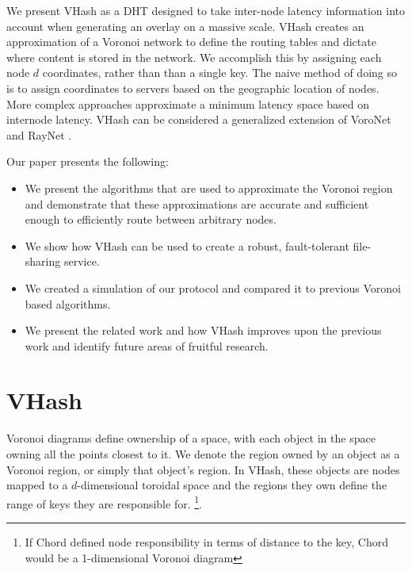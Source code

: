 \documentclass{IEEEtran}
\begin{document}
 

We present VHash as a DHT designed to take inter-node latency information into account when generating an overlay on a massive scale.  VHash creates an approximation of a Voronoi network to define the routing tables and dictate where content is stored in the network.  We accomplish this by assigning each node $d$ coordinates, rather than than a single key.  The naive method of doing so is to assign coordinates to servers based on the geographic location of nodes. More complex approaches approximate a minimum latency space based on internode latency. VHash can be considered  a generalized extension of VoroNet \cite{voronet} and  RayNet \cite{raynet}.



 

Our paper presents the following:
\begin{itemize}
	\item We present the algorithms that are used to approximate the Voronoi region and demonstrate that these approximations are accurate and sufficient enough to efficiently route between arbitrary nodes.
	\item We show how VHash can be used to create a robust, fault-tolerant file-sharing service.
	\item We created a simulation of our protocol and compared it to previous Voronoi based algorithms.
	\item We present the related work and how VHash improves upon the previous work and identify future areas of fruitful research.
\end{itemize}


\section{VHash}
Voronoi diagrams define ownership of a space, with each object in the space owning all the points closest to it.  We denote the region owned by an object as a Voronoi region, or simply that object's region.  In VHash, these objects are nodes mapped to a $d$-dimensional toroidal space and the regions they own define the range of keys they are responsible for.  \footnote{If Chord defined node responsibility in terms of distance to the key, Chord would be a 1-dimensional Voronoi diagram}.  
\end{document}
